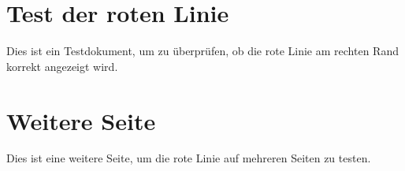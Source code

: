 \documentclass{article}
\begin{document}
\section*{Test der roten Linie}

Dies ist ein Testdokument, um zu überprüfen, ob die rote Linie am rechten Rand korrekt angezeigt wird.

\newpage

\section*{Weitere Seite}

Dies ist eine weitere Seite, um die rote Linie auf mehreren Seiten zu testen.
\end{document}
